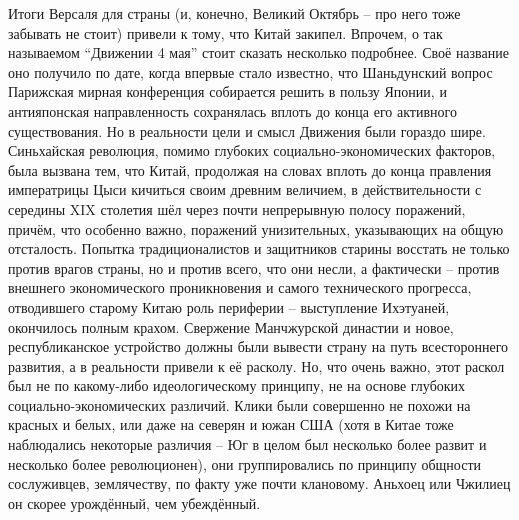 Итоги Версаля для страны (и, конечно, Великий Октябрь – про него тоже забывать не стоит) привели к тому, что Китай закипел. Впрочем, о так называемом “Движении 4 мая” стоит сказать несколько подробнее. Своё название оно получило по дате, когда впервые стало известно, что Шаньдунский вопрос Парижская мирная конференция собирается решить в пользу Японии, и антияпонская направленность сохранялась вплоть до конца его активного существования. Но в реальности цели и смысл Движения были гораздо шире. Синьхайская революция, помимо глубоких социально-экономических факторов, была вызвана тем, что Китай, продолжая на словах вплоть до конца правления императрицы Цыси кичиться своим древним величием, в действительности с середины XIX столетия шёл через почти непрерывную полосу поражений, причём, что особенно важно, поражений унизительных, указывающих на общую отсталость. Попытка традиционалистов и защитников старины восстать не только против врагов страны, но и против всего, что они несли, а фактически – против внешнего экономического проникновения и самого технического прогресса, отводившего старому Китаю роль периферии – выступление Ихэтуаней, окончилось полным крахом. Свержение Манчжурской династии и новое, республиканское устройство должны были вывести страну на путь всестороннего развития, а в реальности привели к её расколу. Но, что очень важно, этот раскол был не по какому-либо идеологическому принципу, не на основе глубоких социально-экономических различий. Клики были совершенно не похожи на красных и белых, или даже на северян и южан США (хотя в Китае тоже наблюдались некоторые различия – Юг в целом был несколько более развит и несколько более революционен), они группировались по принципу общности сослуживцев, землячеству, по факту уже почти клановому. Аньхоец или Чжилиец он скорее урождённый, чем убеждённый.


